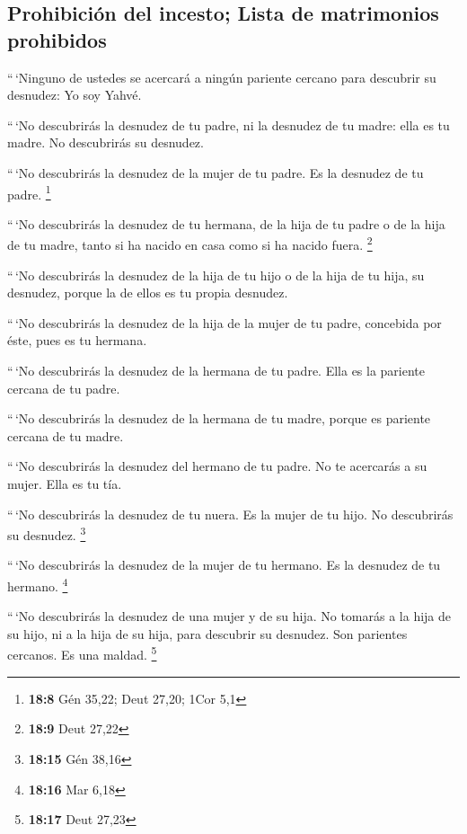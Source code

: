 \hypertarget{prohibiciuxf3n-del-incesto-lista-de-matrimonios-prohibidos}{%
\subsection{Prohibición del incesto; Lista de matrimonios
prohibidos}\label{prohibiciuxf3n-del-incesto-lista-de-matrimonios-prohibidos}}

 ``\,`Ninguno de ustedes se acercará a ningún pariente
cercano para descubrir su desnudez: Yo soy Yahvé.

 ``\,`No descubrirás la desnudez de tu padre, ni la
desnudez de tu madre: ella es tu madre. No descubrirás su desnudez.

 ``\,`No descubrirás la desnudez de la mujer de tu padre.
Es la desnudez de tu padre. \footnote{\textbf{18:8} Gén 35,22; Deut
  27,20; 1Cor 5,1}

 ``\,`No descubrirás la desnudez de tu hermana, de la hija
de tu padre o de la hija de tu madre, tanto si ha nacido en casa como si
ha nacido fuera. \footnote{\textbf{18:9} Deut 27,22}

 ``\,`No descubrirás la desnudez de la hija de tu hijo o
de la hija de tu hija, su desnudez, porque la de ellos es tu propia
desnudez.

 ``\,`No descubrirás la desnudez de la hija de la mujer
de tu padre, concebida por éste, pues es tu hermana.

 ``\,`No descubrirás la desnudez de la hermana de tu
padre. Ella es la pariente cercana de tu padre.

 ``\,`No descubrirás la desnudez de la hermana de tu
madre, porque es pariente cercana de tu madre.

 ``\,`No descubrirás la desnudez del hermano de tu padre.
No te acercarás a su mujer. Ella es tu tía.

 ``\,`No descubrirás la desnudez de tu nuera. Es la mujer
de tu hijo. No descubrirás su desnudez. \footnote{\textbf{18:15} Gén
  38,16}

 ``\,`No descubrirás la desnudez de la mujer de tu
hermano. Es la desnudez de tu hermano. \footnote{\textbf{18:16} Mar 6,18}

 ``\,`No descubrirás la desnudez de una mujer y de su
hija. No tomarás a la hija de su hijo, ni a la hija de su hija, para
descubrir su desnudez. Son parientes cercanos. Es una maldad.
\footnote{\textbf{18:17} Deut 27,23}

